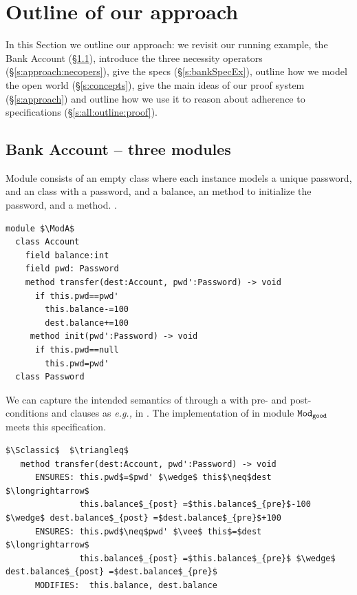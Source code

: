 

\section{Outline of our approach}
\label{s:outline}
 
In this Section we outline our approach:  
we  revisit  our running example, the Bank Account (\S\ref{s:bank}),  
introduce the three necessity operators (\S \ref{s:approach:necopers}),  give 
the \Nec specs (\S \ref{s:bankSpecEx}),
   outline how we model the open world (\S\ref{s:concepts}), 
give the main ideas of our proof system (\S\ref{s:approach})
and   outline 
how we use it to reason 
about adherence to \Nec specifications  (\S\ref{s:all:outline:proof}).
 

 \subsection{Bank Account -- three modules}
\label{s:bank}
  
Module \ModA consists of an empty 
 class where each instance models a unique password, and an   class with a password, and a balance, an  method to 
initialize the password, and 
a
 method. 
.
%
% 
\begin{lstlisting}[mathescape=true, language=Chainmail, frame=lines]
module $\ModA$
  class Account
    field balance:int 
    field pwd: Password
    method transfer(dest:Account, pwd':Password) -> void
      if this.pwd==pwd'
        this.balance-=100
        dest.balance+=100
     method init(pwd':Password) -> void
      if this.pwd==null
        this.pwd=pwd'
  class Password
\end{lstlisting}
%
\noindent 
We can capture the intended semantics of     
through  {a}  \funcSpec with pre- and post- conditions and  clauses as \emph{e.g.,} in \citeauthor{Leavens-etal07,dafny13}.
The implementation of   in module  ${\texttt{Mod}}_{{\texttt{good}}}$ meets
this specification.

\begin{lstlisting}[mathescape=true, frame=lines, language=Chainmail]
$\Sclassic$  $\triangleq$
   method transfer(dest:Account, pwd':Password) -> void  
      ENSURES: this.pwd$=$pwd' $\wedge$ this$\neq$dest  $\longrightarrow$  
               this.balance$_{post} =$this.balance$_{pre}$-100 $\wedge$ dest.balance$_{post} =$dest.balance$_{pre}$+100
      ENSURES: this.pwd$\neq$pwd' $\vee$ this$=$dest  $\longrightarrow$ 
               this.balance$_{post} =$this.balance$_{pre}$ $\wedge$ dest.balance$_{post} =$dest.balance$_{pre}$ 
      MODIFIES:  this.balance, dest.balance        
\end{lstlisting}
 
